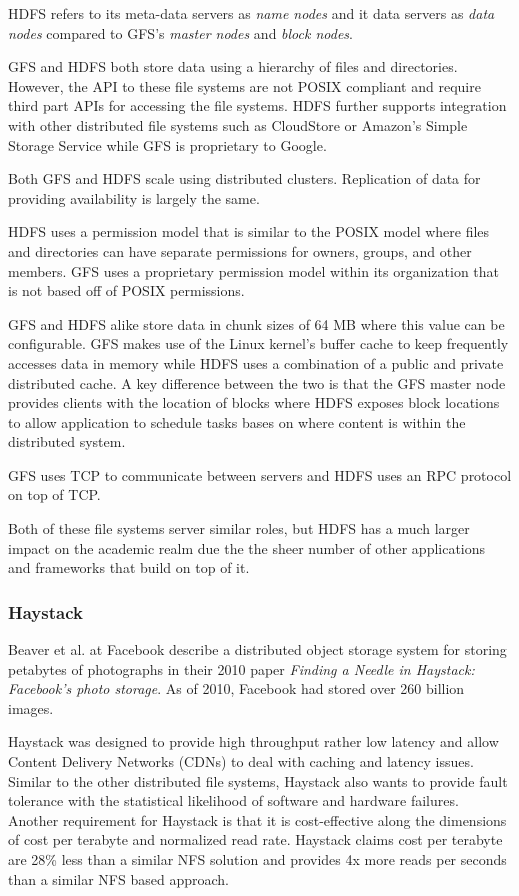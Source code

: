 \documentclass[]{article}
\begin{document}
HDFS refers to its meta-data servers as \textit{name nodes} and it data servers as \textit{data nodes} compared to GFS's \textit{master nodes} and \textit{block nodes}.

GFS and HDFS both store data using a hierarchy of files and directories. However, the API to these file systems are not POSIX compliant and require third part APIs for accessing the file systems. HDFS further supports integration with other distributed file systems such as CloudStore or Amazon's Simple Storage Service while GFS is proprietary to Google.

Both GFS and HDFS scale using distributed clusters. Replication of data for providing availability is largely the same.

HDFS uses a permission model that is similar to the POSIX model where files and directories can have separate permissions for owners, groups, and other members. GFS uses a proprietary permission model within its organization that is not based off of POSIX permissions.

GFS and HDFS alike store data in chunk sizes of 64 MB where this value can be configurable. GFS makes use of the Linux kernel's buffer cache to keep frequently accesses data in memory while HDFS uses a combination of a public and private distributed cache. A key difference between the two is that the GFS master node provides clients with the location of blocks where HDFS exposes block locations to allow application to schedule tasks bases on where content is within the distributed system.

GFS uses TCP to communicate between servers and HDFS uses an RPC protocol on top of TCP.

Both of these file systems server similar roles, but HDFS has a much larger impact on the academic realm due the the sheer number of other applications and frameworks that build on top of it.

\subsubsection{Haystack}
Beaver et al. at Facebook describe a distributed object storage system for storing petabytes of photographs in their 2010 paper \textit{Finding a Needle in Haystack: Facebook's photo storage}\cite{beaver_finding_2010}. As of 2010, Facebook had stored over 260 billion images.

Haystack was designed to provide high throughput rather low latency and allow Content Delivery Networks (CDNs) to deal with caching and latency issues. Similar to the other distributed file systems, Haystack also wants to provide fault tolerance with the statistical likelihood of software and hardware failures. Another requirement for Haystack is that it is cost-effective along the dimensions of cost per terabyte and normalized read rate. Haystack claims cost per terabyte are 28\% less than a similar NFS solution and provides 4x more reads per seconds than a similar NFS based approach.
\end{document}
